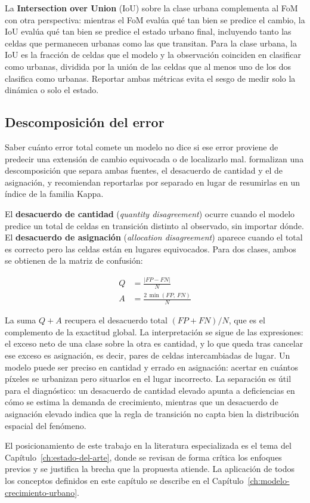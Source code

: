 La \textbf{Intersection over Union} (IoU) sobre la clase urbana complementa al FoM con otra perspectiva: mientras el FoM evalúa qué tan bien se predice el cambio, la IoU evalúa qué tan bien se predice el estado urbano final, incluyendo tanto las celdas que permanecen urbanas como las que transitan. Para la clase urbana, la IoU es la fracción de celdas que el modelo y la observación coinciden en clasificar como urbanas, dividida por la unión de las celdas que al menos uno de los dos clasifica como urbanas. Reportar ambas métricas evita el sesgo de medir solo la dinámica o solo el estado.

\subsection{Descomposición del error}

Saber cuánto error total comete un modelo no dice si ese error proviene de predecir una extensión de cambio equivocada o de localizarlo mal. \textcite{PontiusMillones2011} formalizan una descomposición que separa ambas fuentes, el desacuerdo de cantidad y el de asignación, y recomiendan reportarlas por separado en lugar de resumirlas en un índice de la familia Kappa.

El \textbf{desacuerdo de cantidad} (\textit{quantity disagreement}) ocurre cuando el modelo predice un total de celdas en transición distinto al observado, sin importar dónde. El \textbf{desacuerdo de asignación} (\textit{allocation disagreement}) aparece cuando el total es correcto pero las celdas están en lugares equivocados. Para dos clases, ambos se obtienen de la matriz de confusión:

\begin{align}
Q &= \frac{|FP - FN|}{N} \label{eq:desacuerdo_cantidad} \\
A &= \frac{2\,\min(FP,\,FN)}{N} \label{eq:desacuerdo_asignacion}
\end{align}

La suma $Q + A$ recupera el desacuerdo total $(FP + FN)/N$, que es el complemento de la exactitud global. La interpretación se sigue de las expresiones: el exceso neto de una clase sobre la otra es cantidad, y lo que queda tras cancelar ese exceso es asignación, es decir, pares de celdas intercambiadas de lugar. Un modelo puede ser preciso en cantidad y errado en asignación: acertar en cuántos píxeles se urbanizan pero situarlos en el lugar incorrecto. La separación es útil para el diagnóstico: un desacuerdo de cantidad elevado apunta a deficiencias en cómo se estima la demanda de crecimiento, mientras que un desacuerdo de asignación elevado indica que la regla de transición no capta bien la distribución espacial del fenómeno.

El posicionamiento de este trabajo en la literatura especializada es el tema del Capítulo~\ref{ch:estado-del-arte}, donde se revisan de forma crítica los enfoques previos y se justifica la brecha que la propuesta atiende. La aplicación de todos los conceptos definidos en este capítulo se describe en el Capítulo~\ref{ch:modelo-crecimiento-urbano}.
